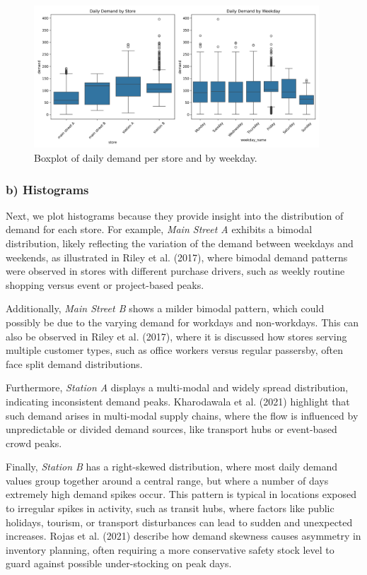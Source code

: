 \documentclass{article}
\begin{document}
\begin{figure}[H]
    \centering
    \includegraphics[width=0.95\textwidth]{figures/boxplot_store_and_weekday.png}
    \caption{Boxplot of daily demand per store and by weekday.}
    \label{fig:boxplots}
\end{figure}

\subsubsection*{b) Histograms}
Next, we plot histograms because they provide insight into the distribution of demand for each store. For example, \emph{Main Street A} exhibits a bimodal distribution, likely reflecting the variation of the demand between  weekdays and weekends, as illustrated in Riley et al. (2017), where bimodal demand patterns were observed in stores with different purchase drivers, such as weekly routine shopping versus event or project-based peaks.

Additionally, \emph{Main Street B} shows a milder bimodal pattern, which could possibly be due to the varying demand for workdays and non-workdays. This can also be observed in Riley et al. (2017), where it is discussed how stores serving multiple customer types, such as office workers versus regular passersby, often face split demand distributions.

Furthermore, \emph{Station A} displays a multi-modal and widely spread distribution, indicating inconsistent demand peaks. Kharodawala et al. (2021) highlight that such demand arises in multi-modal supply chains, where the flow is influenced by unpredictable or divided demand sources, like transport hubs or event-based crowd peaks.

Finally, \emph{Station B} has a right-skewed distribution, where most daily demand values group together around a central range, but where a number of days extremely high demand spikes occur. This pattern is typical in locations exposed to irregular spikes in activity, such as transit hubs, where factors like public holidays, tourism, or transport disturbances can lead to sudden and unexpected increases. Rojas et al. (2021) describe how demand skewness causes asymmetry in inventory planning, often requiring a more conservative safety stock level to guard against possible under-stocking on peak days.
\end{document}
